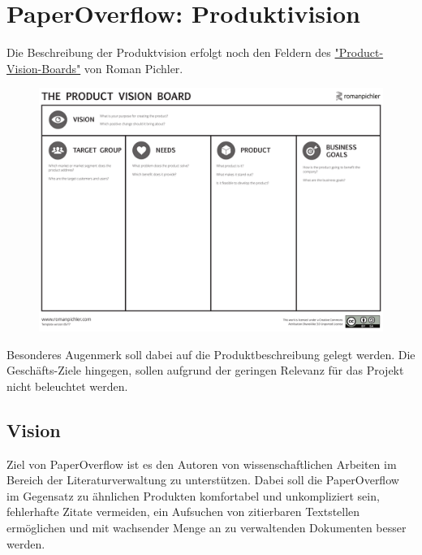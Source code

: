 \documentclass[a4paper,12pt]{article}
\begin{document}
\section{PaperOverflow: Produktivision}
Die Beschreibung der Produktvision erfolgt noch den Feldern des  \href{http://www.romanpichler.com/tools/vision-board/}{"Product-Vision-Boards"} von Roman Pichler. 
\begin{figure}[h!]
  \centering
  \includegraphics[width=0.7\linewidth]{res/PVB.pdf}
\end{figure}

Besonderes Augenmerk soll dabei auf die Produktbeschreibung gelegt werden.
Die Geschäfts-Ziele hingegen, sollen aufgrund der geringen Relevanz für das Projekt nicht beleuchtet werden.

\subsection{Vision}
Ziel von PaperOverflow ist es den Autoren von wissenschaftlichen Arbeiten im Bereich der Literaturverwaltung zu unterstützen. Dabei soll die PaperOverflow im Gegensatz zu ähnlichen Produkten komfortabel und unkompliziert sein, fehlerhafte Zitate vermeiden, ein Aufsuchen von zitierbaren Textstellen ermöglichen und mit wachsender Menge an zu verwaltenden Dokumenten besser werden.
\end{document}
